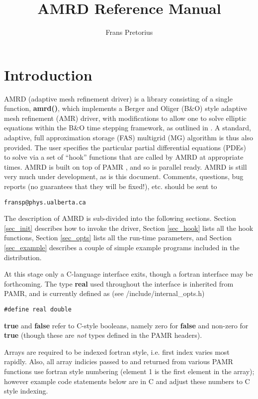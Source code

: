 \documentclass[aps,amssymb,unsortedaddress,nofootinbib]{revtex4}
\begin{document}
\title{AMRD Reference Manual}

\author{Frans Pretorius}

\address{Department of Physics \\
P-412, Avadh Bhatia Physics Laboratory \\
University of Alberta \\
Edmonton, AB, T6G 2J1}

\maketitle

\tableofcontents

\section{Introduction}

AMRD (adaptive mesh refinement driver) is a library consisting of a
single function, {\bf amrd()}, which implements a Berger and Oliger (B\&O)
style adaptive mesh refinement (AMR) driver, with modifications to
allow one to solve elliptic equations within the B\&O time stepping framework,
as outlined in \cite{fpthesis}. A standard, adaptive, 
full approximation storage (FAS) multigrid (MG) algorithm is thus 
also provided.  The user specifies the particular 
partial differential equations (PDEs) to solve via a set of ``hook'' functions
that are called by AMRD at appropriate times. AMRD is built on top of 
PAMR \cite{pamr}, and so is parallel ready.
AMRD is still very much under development, as is this document. Comments, questions,
bug reports (no guarantees that they will be fixed!), etc. should be
sent to
\begin{verbatim}
fransp@phys.ualberta.ca
\end{verbatim}

The description of AMRD is sub-divided into the following sections. 
Section \ref{sec_init} describes how to invoke the driver, Section
\ref{sec_hook} lists all the hook functions, Section \ref{sec_opts}
lists all the run-time parameters, and Section \ref{sec_example}
describes a couple of simple example programs included in the distribution. 

At this stage only
a C-language interface exits, though a fortran interface may be forthcoming.
The type {\bf real} used throughout the interface is inherited from PAMR, and
is currently defined as (see {\rm /include/internal\_opts.h})
\begin{verbatim}
#define real double
\end{verbatim}
{\bf true} and {\bf false} refer to C-style booleans, namely zero for
{\bf false} and non-zero for {\bf true} (though these are {\em not} 
types defined in the PAMR headers).
\par
Arrays are required to be indexed fortran style, i.e. first index
varies most rapidly. Also, all array indicies passed to and returned from
various PAMR functions use fortran style numbering (element 1 is the first 
element in the array); however example code statements below are in C and
adjust these numbers to C style indexing.
\end{document}
